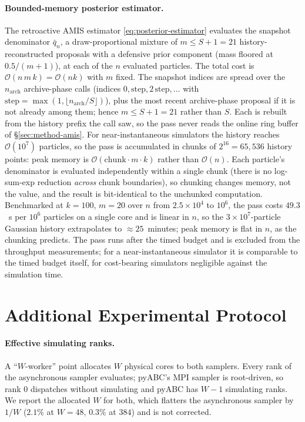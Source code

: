 \documentclass[pdflatex,sn-mathphys-num]{sn-jnl}
\theoremstyle{plain}
\theoremstyle{definition}
\begin{document}
\begin{appendices}
\paragraph{Bounded-memory posterior estimator.} The retroactive AMIS estimator \eqref{eq:posterior-estimator} evaluates the snapshot denominator $\bar q_n$, a draw-proportional mixture of $m\le S{+}1=21$ history-reconstructed proposals with a defensive prior component (mass floored at $0.5/(m{+}1)$), at each of the $n$ evaluated particles. The total cost is $\mathcal{O}(n\,m\,k)=\mathcal{O}(nk)$ with $m$ fixed. The snapshot indices are spread over the $n_{\text{arch}}$ archive-phase calls (indices $0,\text{step},2\,\text{step},\dots$ with $\text{step}=\max(1,\lfloor n_{\text{arch}}/S\rfloor)$), plus the most recent archive-phase proposal if it is not already among them; hence $m\le S{+}1=21$ rather than $S$. Each is rebuilt from the history prefix the call saw, so the pass never reads the online ring buffer of \S\ref{sec:method-amis}. For near-instantaneous simulators the history reaches $\mathcal{O}(10^7)$ particles, so the pass is accumulated in chunks of $2^{16}=65{,}536$ history points: peak memory is $\mathcal{O}(\text{chunk}\cdot m\cdot k)$ rather than $\mathcal{O}(n)$. Each particle's denominator is evaluated independently within a single chunk (there is no log-sum-exp reduction \emph{across} chunk boundaries), so chunking changes memory, not the value, and the result is bit-identical to the unchunked computation. Benchmarked at $k=100$, $m=20$ over $n$ from $2.5\times10^4$ to $10^6$, the pass costs $49.3$~s per $10^6$ particles on a single core and is linear in $n$, so the $3\times10^7$-particle Gaussian history extrapolates to ${\approx}25$~minutes; peak memory is flat in $n$, as the chunking predicts. The pass runs after the timed budget and is excluded from the throughput measurements; for a near-instantaneous simulator it is comparable to the timed budget itself, for cost-bearing simulators negligible against the simulation time.

\section{Additional Experimental Protocol}\label{app:protocol}

\paragraph{Effective simulating ranks.} A ``$W$-worker'' point allocates $W$ physical cores to both samplers. Every rank of the asynchronous sampler evaluates; pyABC's MPI sampler is root-driven, so rank $0$ dispatches without simulating and pyABC has $W{-}1$ simulating ranks. We report the allocated $W$ for both, which flatters the asynchronous sampler by $1/W$ ($2.1\%$ at $W{=}48$, $0.3\%$ at $384$) and is not corrected.


\end{appendices}
\end{document}
